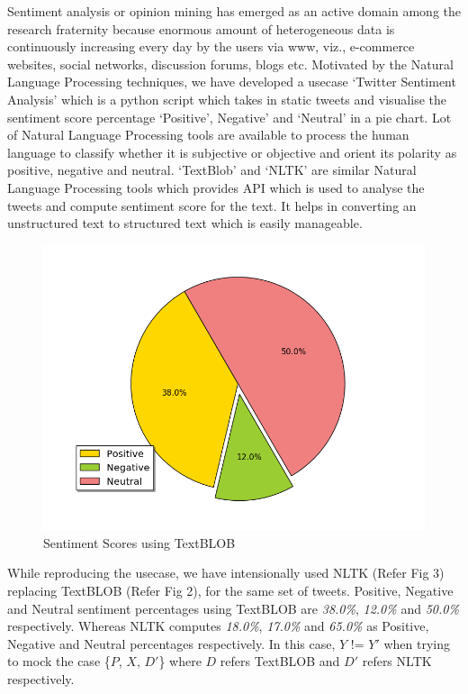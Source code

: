 \documentclass[10pt,conference,twocolumn]{IEEEtran}
\begin{document}
Sentiment analysis or opinion mining has emerged as an active domain among the research fraternity because enormous amount of heterogeneous data is continuously increasing every day by the users via www, viz., e-commerce websites, social networks, discussion forums, blogs etc. Motivated by the Natural Language Processing techniques,  we have developed a usecase ‘Twitter Sentiment Analysis’ which is a python script which takes in static tweets and visualise the sentiment score percentage ‘Positive’, Negative’ and ‘Neutral’ in a pie chart. Lot of Natural Language Processing tools are available to process the human language to classify whether it is subjective or objective and orient its polarity as positive, negative and neutral.
‘TextBlob’ and ‘NLTK’ are similar Natural Language Processing tools which provides API which is used to 
analyse the tweets and compute sentiment score for the text. It helps in converting an unstructured text to structured text which is easily manageable.  
\begin{figure}[H]
\begin{center}
            \includegraphics[scale=0.36]{Pie_TextBLOB.png}
\end{center}
\centering
\caption{Sentiment Scores using TextBLOB}
\end{figure} 
While reproducing the usecase, we have intensionally used NLTK (Refer Fig 3) replacing TextBLOB (Refer Fig 2), for the same set of tweets. Positive, Negative and Neutral sentiment percentages using TextBLOB are \emph{38.0\%}, \emph{12.0\%} and \emph{50.0\%} respectively. Whereas NLTK computes \emph{18.0\%}, \emph{17.0\%} and \emph{65.0\%} as Positive, Negative and Neutral percentages respectively.  
In this case, $Y$ != $Y'$ when trying to mock the case  \{$P$, $X$, $D'$\} where $D$ refers TextBLOB and  $D'$ refers NLTK respectively.
\end{document}

